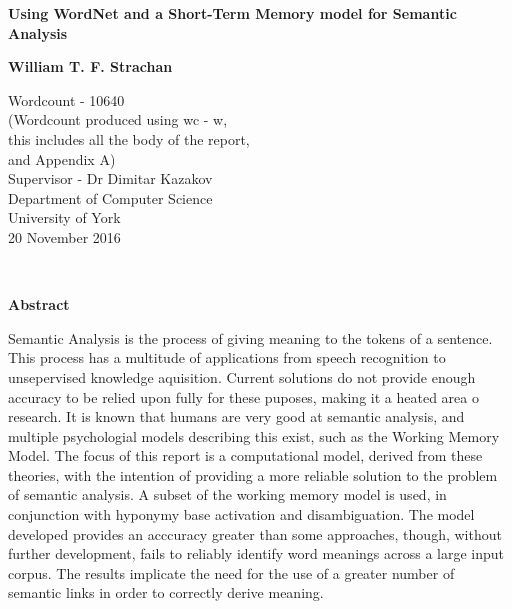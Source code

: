 \documentclass[]{article}
\begin{document}
\begin{titlepage}
    \begin{center}
        \vspace*{1cm}
        
        \Huge
        \textbf{Using WordNet and a Short-Term Memory model for Semantic Analysis}
        \vspace{2cm}
        
        \Large
        \textbf{William T. F. Strachan}
        
        \vfill
                
        \vspace{0.8cm}
        
        \Large
        Wordcount - 10640\\
        \small
        (Wordcount produced using wc - w, \\
        this includes all the body of the report,\\
         and Appendix A)\\
        \large
        \vspace{0.8cm}
        Supervisor - Dr Dimitar Kazakov\\
        Department of Computer Science\\
        University of York\\
        20 November 2016
        
    \end{center}
\end{titlepage}
\
\vfill
\begin{center}
	\textbf{Abstract}
\end{center} 
\label{sec:Abstract}
Semantic Analysis is the process of giving meaning to the tokens of a sentence. This process has a multitude of applications from speech recognition to unsepervised knowledge aquisition. Current solutions do not provide enough accuracy to be relied upon fully for these puposes, making it a heated area o research. It is known that humans are very good at semantic analysis, and multiple psychologial models describing this exist, such as the Working Memory Model. The focus of this report is a computational model, derived from these theories, with the intention of providing a more reliable solution to the problem of semantic analysis. A subset of the working memory model is used, in conjunction with hyponymy base activation and disambiguation. The model developed provides an acccuracy greater than some approaches, though, without further development, fails to reliably identify word meanings across a large input corpus. The results implicate the need for the use of a greater number of semantic links in order to correctly derive meaning.
\end{document}
